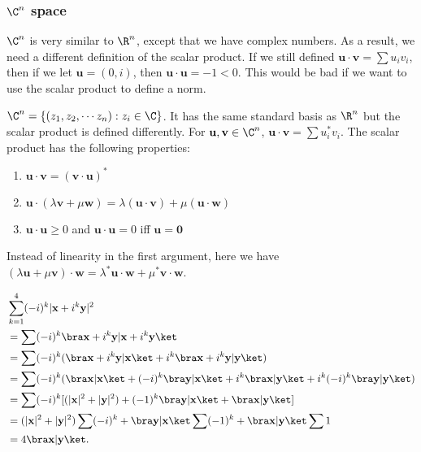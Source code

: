 \documentclass[a4paper]{article}
\begin{document}
\subsubsection{\texorpdfstring{$\C^n$}{Cn} space}
$\C^n$ is very similar to $\R^n$, except that we have complex numbers. As a result, we need a different definition of the scalar product. If we still defined $\mathbf{u}\cdot \mathbf{v} = \sum u_i v_i$, then if we let $\mathbf{u} = (0, i)$, then $\mathbf{u}\cdot \mathbf{u} = -1 < 0$. This would be bad if we want to use the scalar product to define a norm.

\begin{defi}[$\C^n$]
  $\C^n = \{(z_1, z_2, \cdots z_n): z_i\in\C\}$. It has the same standard basis as $\R^n$ but the scalar product is defined differently. For $\mathbf{u, v}\in \C^n$, $\mathbf{u\cdot v} = \sum u_i^*v_i$. The scalar product has the following properties:
  \begin{enumerate}
    \item $\mathbf{u}\cdot \mathbf{v} = (\mathbf{v}\cdot \mathbf{u})^*$
    \item $\mathbf{u}\cdot(\lambda\mathbf{v}+\mu\mathbf{w}) = \lambda\mathbf{(u\cdot v)} + \mu\mathbf{(u\cdot w)}$
    \item $\mathbf{u\cdot u} \geq 0$ and $\mathbf{u\cdot u} = 0$ iff $\mathbf{u = 0}$
  \end{enumerate}
\end{defi}
Instead of linearity in the first argument, here we have $(\lambda\mathbf{u} + \mu\mathbf{v})\cdot\mathbf{w} = \lambda^*\mathbf{u}\cdot \mathbf{w} + \mu^*\mathbf{v}\cdot \mathbf{w}$.

\begin{eg}
  \begin{align*}
    &\sum_{k = 1}^4 (-i)^k|\mathbf{x} + i^k\mathbf{y}|^2\\
    &= \sum(-i)^k\bra\mathbf{x} + i^k \mathbf{y}|\mathbf{x} + i^k\mathbf{y}\ket\\
    &= \sum(-i)^k (\bra\mathbf{x} + i^k\mathbf{y}|\mathbf{x}\ket + i^k\bra\mathbf{x} + i^k\mathbf{y} | \mathbf{y}\ket)\\
    &= \sum(-i)^k (\bra\mathbf{x}|\mathbf{x}\ket + (-i)^k\bra\mathbf{y}|\mathbf{x}\ket + i^k\bra\mathbf{x}|\mathbf{y}\ket + i^k(-i)^k\bra\mathbf{y}|\mathbf{y}\ket)\\
    &= \sum(-i)^k [(|\mathbf{x}|^2 + |\mathbf{y}|^2) + (-1)^k\bra\mathbf{y}|\mathbf{x}\ket + \bra\mathbf{x}|\mathbf{y}\ket]\\
    &= (|\mathbf{x}|^2 + |\mathbf{y}|^2)\sum(-i)^k + \bra\mathbf{y}|\mathbf{x}\ket\sum(-1)^k + \bra\mathbf{x}|\mathbf{y}\ket\sum1\\
    &= 4\bra\mathbf{x}|\mathbf{y}\ket.
  \end{align*}
\end{eg}
\end{document}
